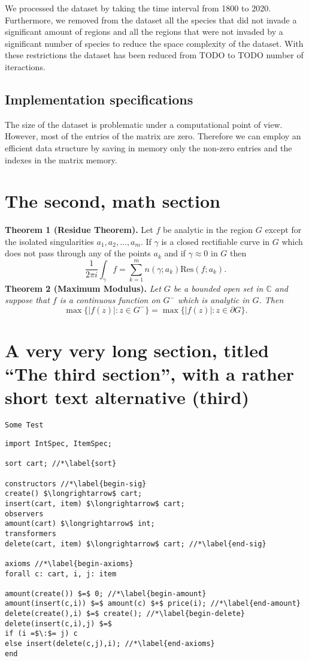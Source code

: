 \documentclass[mscthesis]{usiinfthesis}
\begin{document}
We processed the dataset by taking the time interval from 1800 to 2020. Furthermore, we removed from the dataset all the species that did not invade a significant amount of regions and all the regions that were not invaded by a significant number of species to reduce the space complexity of the dataset. With these restrictions the dataset has been reduced from TODO to TODO number of iteractions.


\subsection{Implementation specifications}
The size of the dataset is problematic under a computational point of view. However, most of the entries of the matrix are zero. Therefore we can employ an efficient data structure by saving in memory only the non-zero entries and the indexes in the matrix memory. 

\section{The second, math section}

\textbf{Theorem 1 (Residue Theorem).}
Let $f$ be analytic in the region $G$ except for the isolated singularities $a_1,a_2,\ldots,a_m$. If $\gamma$ is a closed rectifiable curve in $G$ which does not pass through any of the points $a_k$ and if $\gamma\approx 0$ in $G$ then
\[
\frac{1}{2\pi i}\int_\gamma f = \sum_{k=1}^m n(\gamma;a_k) \text{Res}(f;a_k).
\]
\textbf{Theorem 2 (Maximum Modulus).}
\emph{Let $G$ be a bounded open set in $\mathbb{C}$ and suppose that $f$ is a continuous function on $G^-$ which is analytic in $G$. Then}
\[
\max\{|f(z)|:z\in G^-\}=\max \{|f(z)|:z\in \partial G \}.
\]

\section[third]{A very very long section, titled ``The third section'', with
  a rather  short text alternative (third)}
\lipsum \texttt{Some Test}
\begin{lstlisting}
import IntSpec, ItemSpec;

sort cart; //*\label{sort}

constructors //*\label{begin-sig}
create() $\longrightarrow$ cart;
insert(cart, item) $\longrightarrow$ cart;
observers
amount(cart) $\longrightarrow$ int;
transformers
delete(cart, item) $\longrightarrow$ cart; //*\label{end-sig}

axioms //*\label{begin-axioms}
forall c: cart, i, j: item 

amount(create()) $=$ 0; //*\label{begin-amount}
amount(insert(c,i)) $=$ amount(c) $+$ price(i); //*\label{end-amount}
delete(create(),i) $=$ create(); //*\label{begin-delete}
delete(insert(c,i),j) $=$
if (i =$\:$= j) c
else insert(delete(c,j),i); //*\label{end-axioms}
end
\end{lstlisting}
\end{document}
